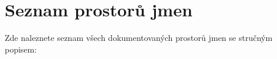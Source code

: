 \section{Seznam prostorů jmen}
Zde naleznete seznam všech dokumentovaných prostorů jmen se stručným popisem\-:\begin{DoxyCompactList}
\item{}
\end{DoxyCompactList}

